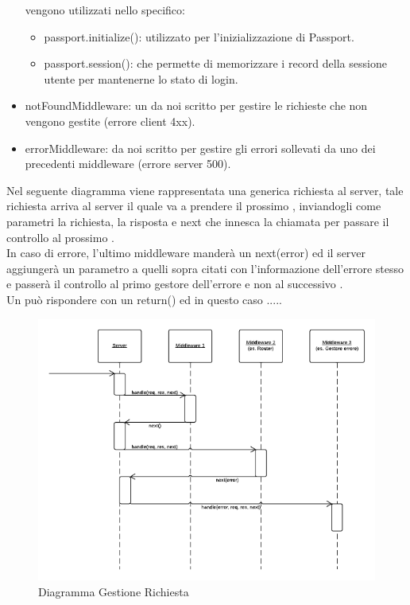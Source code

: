 \begin{itemize}
vengono utilizzati nello specifico:
	\begin{itemize}
	\item{passport.initialize()}:  utilizzato per l'inizializzazione di Passport.
	\item{passport.session()}:   che permette di memorizzare i record della sessione utente per mantenerne lo stato di login. 
	\end{itemize}
\item{notFoundMiddleware}: un  da noi scritto per gestire le richieste che non vengono gestite (errore client 4xx).
\item{errorMiddleware}:  da noi scritto per gestire gli errori sollevati da uno dei precedenti middleware (errore server 500).
\end{itemize}
Nel seguente diagramma viene rappresentata una generica richiesta al server, tale richiesta arriva al server il quale va a prendere il prossimo , inviandogli come parametri la richiesta, la risposta e next che innesca la chiamata per passare il controllo al prossimo .  \\
In caso di errore, l'ultimo middleware manderà un next(error) ed il server aggiungerà un parametro a quelli sopra citati con l'informazione dell'errore stesso e passerà il controllo al primo gestore dell'errore e non al successivo . \\
Un  può rispondere con un return() ed in questo caso ..... %

\begin{figure}[H]
	\begin{center} 
		\includegraphics[scale=0.60]{scenari/Diagramma Gestione Richiesta.png}  
		\caption{Diagramma Gestione Richiesta}
	\end{center}  
\end{figure} 

